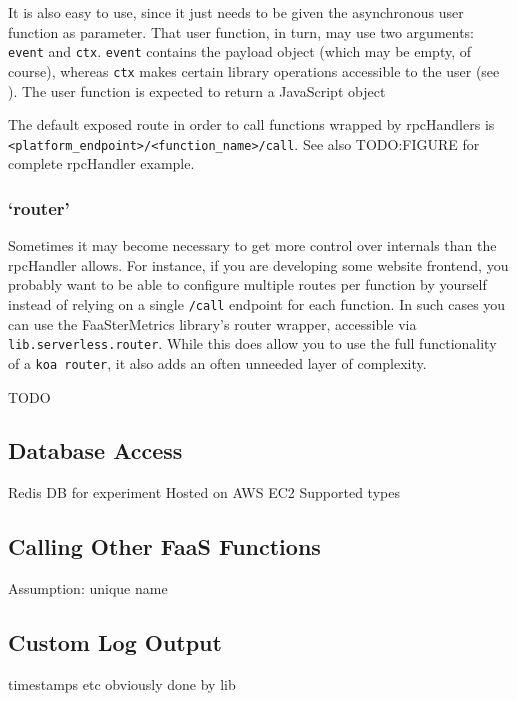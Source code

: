\documentclass[../main.tex]{subfiles}
\begin{document}
It is also easy to use, since it just needs to be given the asynchronous user function as parameter. 
That user function, in turn, may use two arguments: \texttt{event} and \texttt{ctx}.
\texttt{event} contains the payload object (which may be empty, of course), whereas \texttt{ctx} makes certain 
library operations accessible to the user (see ).
The user function is expected to return a JavaScript object

The default exposed route in order to call functions wrapped by rpcHandlers is 
\texttt{<platform\_endpoint>/<function\_name>/call}.
See also TODO:\@ FIGURE for complete rpcHandler example.

\subsubsection{`router'}%
\label{ssub:functionRouter}

Sometimes it may become necessary to get more control over internals than the rpcHandler allows.
For instance, if you are developing some website frontend, you probably want to be able to configure multiple routes per function by yourself
instead of relying on a single \texttt{/call} endpoint for each function.
In such cases you can use the FaaSterMetrics library's router wrapper, 
accessible via \texttt{lib.serverless.router}.
While this does allow you to use the full functionality of a \texttt{koa router}\protect\footnotemark,
it also adds an often unneeded layer of complexity.

TODO

\subsection{Database Access}\label{sub:functionDBAccess}
Redis DB for experiment
Hosted on AWS EC2
Supported types

\subsection{Calling Other FaaS Functions}\label{sub:functionCallingOther}
Assumption: unique name


\subsection{Custom Log Output}\label{sub:functionCustomLogs}
timestamps etc obviously done by lib
\end{document}

